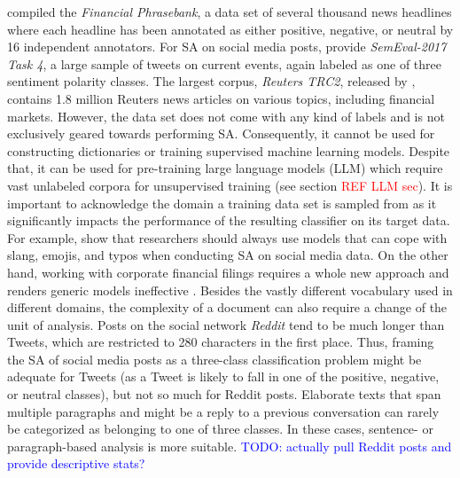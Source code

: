   compiled the \emph{Financial Phrasebank}, a data set of several thousand news headlines where each headline has been annotated as either positive, negative, or neutral by 16 independent annotators. For SA on social media posts,  provide \emph{SemEval-2017 Task 4}, a large sample of tweets on current events, again labeled as one of three sentiment polarity classes. The largest corpus, \emph{Reuters TRC2}, released by , contains 1.8 million Reuters news articles on various topics, including financial markets. However, the data set does not come with any kind of labels and is not exclusively geared towards performing SA. Consequently, it cannot be used for constructing dictionaries or training supervised machine learning models. Despite that, it can be used for pre-training large language models (LLM) which require vast unlabeled corpora for unsupervised training (see section \textcolor{red}{REF LLM sec}).\newline
 It is important to acknowledge the domain a training data set is sampled from as it significantly impacts the performance of the resulting classifier on its target data. For example,  show that researchers should always use models that can cope with slang, emojis, and typos when conducting SA on social media data. On the other hand, working with corporate financial filings requires a whole new approach and renders generic models ineffective . Besides the vastly different vocabulary used in different domains, the complexity of a document can also require a change of the unit of analysis. Posts on the social network \emph{Reddit} tend to be much longer than Tweets, which are restricted to 280 characters in the first place. Thus, framing the SA of social media posts as a three-class classification problem might be adequate for Tweets (as a Tweet is likely to fall in one of the positive, negative, or neutral classes), but not so much for Reddit posts. Elaborate texts that span multiple paragraphs and might be a reply to a previous conversation can rarely be categorized as belonging to one of three classes. In these cases, sentence- or paragraph-based analysis is more suitable. \textcolor{blue}{TODO: actually pull Reddit posts and provide descriptive stats?}





